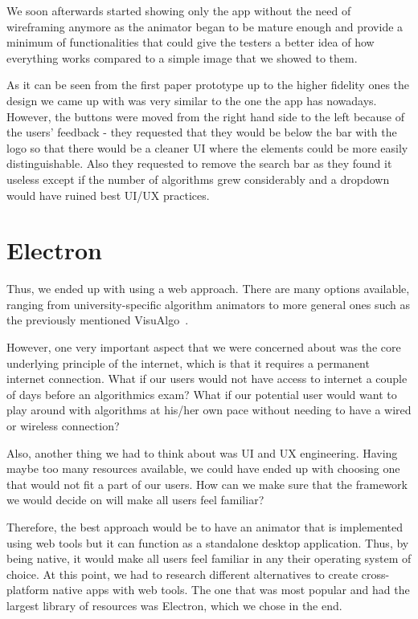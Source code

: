 \documentclass{l4proj}
\begin{document}
We soon afterwards started showing only the app without the need of wireframing anymore as the animator began to be
mature enough and provide a minimum of functionalities that could give the testers a better idea of how everything
works compared to a simple image that we showed to them.

As it can be seen from the first paper prototype up to the higher fidelity ones the design we came up with was very
similar to the one the app has nowadays. However, the buttons were moved from the right hand side to the left because
of the users' feedback - they requested that they would be below the bar with the logo so that there would be a cleaner
UI where the elements could be more easily distinguishable. Also they requested to remove the search bar as they found
it useless except if the number of algorithms grew considerably and a dropdown would have ruined best UI/UX practices.

\section{Electron}

Thus, we ended up with using a web approach. There are many options available, ranging from university-specific algorithm animators to more general ones such as the previously mentioned VisuAlgo~\cite{visualgo}.

However, one very important aspect that we were concerned about was the core underlying principle of the internet, which is that it requires a permanent internet connection. What if our users would not have access to internet a couple of days before an algorithmics exam? What if our potential user would want to play around with algorithms at his/her own pace without needing to have a wired or wireless connection?

Also, another thing we had to think about was UI and UX engineering. Having maybe too many resources available, we could have ended up with choosing one that would not fit a part of our users. How can we make sure that the framework we would decide on will make all users feel familiar?

Therefore, the best approach would be to have an animator that is implemented using web tools but it can function as a standalone desktop application. Thus, by being native, it would make all users feel familiar in any their operating system of choice. At this point, we had to research different alternatives to create cross-platform native apps with web tools. The one that was most popular and had the largest library of resources was Electron, which we chose in the end.
\end{document}
